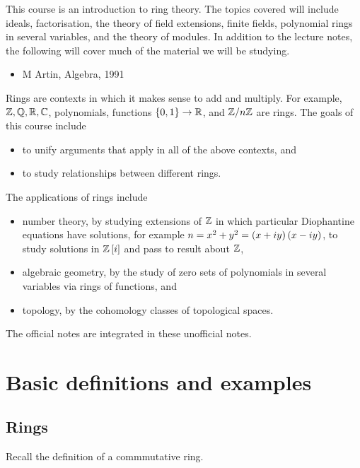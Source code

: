 This course is an introduction to ring theory. The topics covered will include ideals, factorisation, the theory of field extensions, finite fields, polynomial rings in several variables, and the theory of modules. In addition to the lecture notes, the following will cover much of the material we will be studying.
\begin{itemize}
\item M Artin, Algebra, 1991
\end{itemize}
Rings are contexts in which it makes sense to add and multiply. For example, $ \mathbb{Z}, \mathbb{Q}, \mathbb{R}, \mathbb{C} $, polynomials, functions $ \cbr{0, 1} \to \R $, and $ \mathbb{Z} / n\mathbb{Z} $ are rings. The goals of this course include
\begin{itemize}
\item to unify arguments that apply in all of the above contexts, and
\item to study relationships between different rings.
\end{itemize}
The applications of rings include
\begin{itemize}
\item number theory, by studying extensions of $ \mathbb{Z} $ in which particular Diophantine equations have solutions, for example $ n = x^2 + y^2 = \br{x + iy}\br{x - iy} $, to study solutions in $ \Z\sbr{i} $ and pass to result about $ \mathbb{Z} $,
\item algebraic geometry, by the study of zero sets of polynomials in several variables via rings of functions, and
\item topology, by the cohomology classes of topological spaces.
\end{itemize}

\begin{note*}
The official notes are integrated in these unofficial notes.
\end{note*}

\pagebreak

\section{Basic definitions and examples}

\subsection{Rings}

Recall the definition of a commmutative ring.

